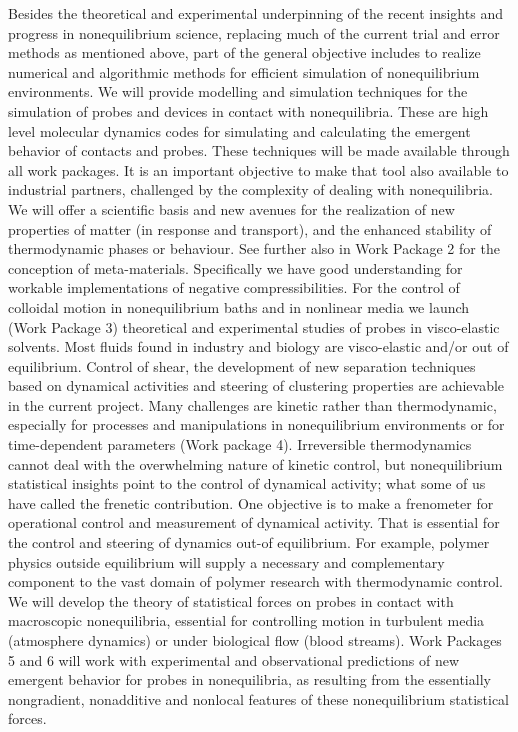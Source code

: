 Besides the theoretical and experimental underpinning of the recent insights and progress in
nonequilibrium science, replacing much of the current trial and error methods as mentioned
above, part of the general objective includes to realize numerical and algorithmic
methods for efficient simulation of nonequilibrium environments.
We will provide modelling and simulation techniques for the simulation of probes and
devices in contact with nonequilibria.  These are high level molecular dynamics codes for
simulating and calculating the emergent behavior of contacts and probes.  These techniques
will be made available through all  work packages. It is an important objective
to make that tool also available to industrial partners, challenged by the complexity of
dealing with nonequilibria.\newline
%
%
We will offer a scientific basis and new avenues for the realization of new properties of
matter (in response and transport), and the enhanced stability of thermodynamic phases or
behaviour.  See further also in Work Package 2 for the conception of
meta-materials. Specifically we have good understanding for workable implementations of
negative compressibilities.\newline
For the control of colloidal motion in nonequilibrium baths and in nonlinear media we launch (Work Package 3) theoretical and experimental studies of probes in visco-elastic
solvents.  Most fluids found in industry and biology are visco-elastic and/or out of
equilibrium.  Control of shear, the development of new separation techniques based on
dynamical activities and steering of clustering properties are achievable in the current
project.\newline
Many challenges are kinetic rather
than thermodynamic, especially for processes and manipulations in nonequilibrium
environments or for time-dependent parameters (Work package 4).  Irreversible thermodynamics cannot deal with
the overwhelming nature of kinetic control, but nonequilibrium statistical insights point to
the control of dynamical activity; what some of us have called the frenetic contribution.
One objective is to make a frenometer for operational control and measurement of dynamical
activity.  That is essential for the control and steering of dynamics out-of equilibrium.
For example, polymer physics outside equilibrium will supply a necessary and complementary
component to the vast domain of polymer research with thermodynamic control.\newline
We will develop the theory of statistical forces on probes in contact with macroscopic
nonequilibria, essential for controlling motion in turbulent media (atmosphere dynamics) or
under biological flow (blood streams).  Work Packages 5 and 6 will work with experimental
and observational predictions of new emergent behavior for probes in nonequilibria, as
resulting from the essentially nongradient, nonadditive and nonlocal features of these
nonequilibrium statistical forces.


